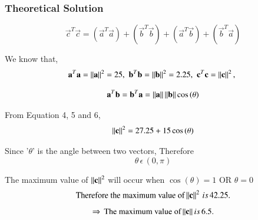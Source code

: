 \documentclass{beamer}
\begin{document}
\begin{frame}[fragile]
    \frametitle{Theoretical Solution}
\begin{equation}
    \vec{c}^T\vec{c} = (\vec{a}^T\vec{a}) + (\vec{b}^T\vec{b}) + (\vec{a}^T\vec{b}) + (\vec{b}^T\vec{a})
\end{equation}

We know that,
\begin{equation}
    \mathbf{a}^T\mathbf{a}= \left\lVert\mathbf{a}\right\rVert^2 = 25, \, \,
    \mathbf{b}^T\mathbf{b} = \left\lVert\mathbf{b}\right\rVert^2 = 2.25, \, \,
    \mathbf{c}^T\mathbf{c}=\left\lVert\mathbf{c}\right\rVert^2, \, \,
   \end{equation}

\begin{equation}
\mathbf{a}^T\mathbf{b}=\mathbf{b}^T\mathbf{a}=\left\lVert\mathbf{a}\right\rVert\left\lVert\mathbf{b}\right\rVert\cos{(\theta)}
\end{equation}

From Equation 4, 5 and 6, 
\begin{equation}
    \left\lVert\mathbf{c}\right\rVert^2 = 27.25 + 15\cos{(\theta)}
\end{equation}

Since '$\theta$' is the angle between two vectors, Therefore 
\begin{equation}
\theta \, \epsilon \, (0,\pi)    
\end{equation}

\newpage

The maximum value of $\left\lVert\mathbf{c}\right\rVert^2$ will occur when $\cos{(\theta)}=1$ OR $\theta = 0$
\begin{equation}
    \text{Therefore the maximum value of} \left\lVert\mathbf{c}\right\rVert^2 \, is \, 42.25.
    \end{equation}
    \begin{equation}
    \Rightarrow \, \text{The maximum value of} \left\lVert\mathbf{c}\right\rVert is \, 6.5.
\end{equation}
\end{frame}
\end{document}
